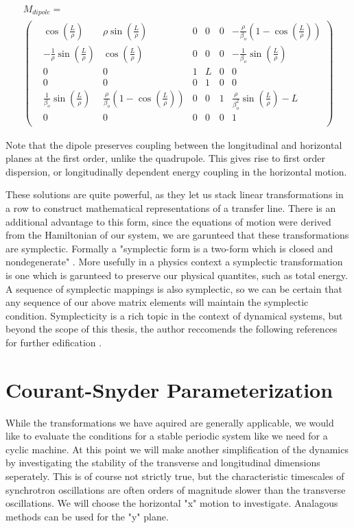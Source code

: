 \begin{multline} \label{mat:dipole}
	M_{dipole} = \\
\begin{pmatrix}
	&\cos{\left(\frac{L}{\rho}\right)} &\rho \sin{\left(\frac{L}{\rho}\right)} &0 &0 &0 &-\frac{\rho}{\beta_o}\left(1 - \cos{\left(\frac{L}{\rho}\right)}\right)\\
	&-\frac{1}{\rho}\sin{\left(\frac{L}{\rho}\right)} &\cos{\left(\frac{L}{\rho}\right)} &0 &0 &0 &-\frac{1}{\beta_o}\sin{\left(\frac{L}{\rho}\right)}\\
	&0 &0 &1 &L &0 &0\\
	&0 &0 &0 &1 &0 &0\\
	&\frac{1}{\beta_o}\sin{\left(\frac{L}{\rho}\right)} &\frac{\rho}{\beta_o}\left(1 - \cos{\left(\frac{L}{\rho}\right)}\right) &0 &0 &1 &\frac{\rho}{\beta_o^2}\sin{\left(\frac{L}{\rho}\right)} - L\\
	&0 &0 &0 &0 &0 &1\\
\end{pmatrix}
\end{multline}

Note that the dipole preserves coupling between the longitudinal and horizontal planes at the first order, unlike the quadrupole. This gives rise to first order dispersion, or longitudinally dependent energy coupling in the horizontal motion. 

These solutions are quite powerful, as they let us stack linear transformations in a row to construct mathematical representations of a transfer line. There is an additional advantage to this form, since the equations of motion were derived from the Hamiltonian of our system, we are garunteed that these transformations are symplectic. Formally a "symplectic form is a two-form which is closed and nondegenerate" \cite{JoseAndSalatan}. More usefully in a physics context a symplectic transformation is one which is garunteed to preserve our physical quantites, such as total energy. A sequence of symplectic mappings is also symplectic, so we can be certain that any sequence of our above matrix elements will maintain the symplectic condition. Symplecticity is a rich topic in the context of dynamical systems, but beyond the scope of this thesis, the author reccomends the following references for further edification \cite{ForrestSymplectic,YoshidaSymplectic}.

\section{Courant-Snyder Parameterization} \label{sec:CSparam}
While the transformations we have aquired are generally applicable, we would like to evaluate the conditions for a stable periodic system like we need for a cyclic machine. At this point we will make another simplification of the dynamics by investigating the stability of the transverse and longitudinal dimensions seperately. This is of course not strictly true, but the characteristic timescales of synchrotron oscillations are often orders of magnitude slower than the transverse oscillations. We will choose the horizontal "x" motion to investigate. Analagous methods can be used for the "y" plane.

